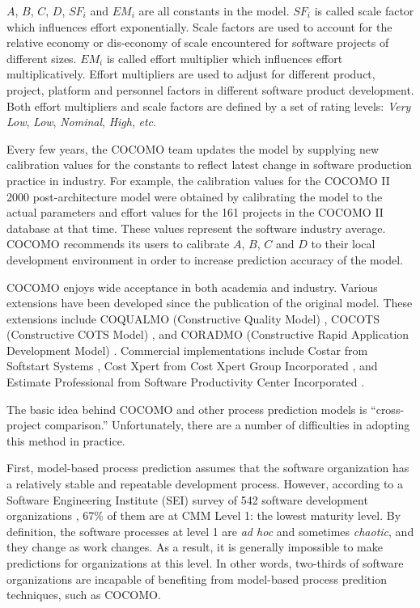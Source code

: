 $A$, $B$, $C$, $D$, $SF_i$ and $EM_i$ are all constants in the model. $SF_i$ is called scale factor which influences effort exponentially. Scale factors are used to account for the relative economy or dis-economy of scale encountered for software projects of different sizes. $EM_i$ is called effort multiplier which influences effort multiplicatively. Effort multipliers are used to adjust for different product, project, platform and personnel factors in different software product development. Both effort multipliers and scale factors are defined by a set of rating levels: \textit{Very Low}, \textit{Low}, \textit{Nominal}, \textit{High}, \textit{etc}. 

Every few years, the COCOMO team updates the model by supplying new calibration values for the constants to reflect latest change in software production practice in industry. For example, the calibration values for the COCOMO II 2000 post-architecture model were obtained by calibrating the model to the actual parameters and effort values for the 161 projects in the COCOMO II database at that time. These values represent the software industry average. COCOMO recommends its users to calibrate $A$, $B$, $C$ and $D$ to their local development environment in order to increase prediction accuracy of the model.

COCOMO enjoys wide acceptance in both academia and industry. Various extensions have been developed since the publication of the original model. These extensions include COQUALMO (Constructive Quality Model) \cite{COQUALMO:1999}, COCOTS (Constructive COTS Model) \cite{COCOTS:2000}, and CORADMO (Constructive Rapid Application Development Model) \cite{CORADMO:2001}. Commercial implementations include Costar from Softstart Systems \cite{Software:Costar}, Cost Xpert from Cost Xpert Group Incorporated \cite{Software:CostXpert}, and Estimate Professional from Software Productivity Center Incorporated \cite{Software:EstimateProfessional}. 

The basic idea behind COCOMO and other process prediction models is ``cross-project comparison.'' Unfortunately, there are a number of difficulties in adopting this method in practice.

First, model-based process prediction assumes that the software organization has a relatively stable and repeatable development process. However, according to a Software Engineering Institute (SEI) survey of 542 software development organizations \cite{Peterson:1997}, 67\% of them are at CMM Level 1: the lowest maturity level. By definition, the software processes at level 1 are \textit{ad hoc} and sometimes \textit{chaotic}, and they change as work changes. As a result, it is generally impossible to make predictions for organizations at this level. In other words, two-thirds of software organizations are incapable of benefiting from model-based process predition techniques, such as COCOMO.

